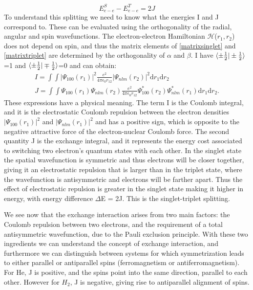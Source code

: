 \begin{equation}
E_{e-e}^S-E_{e-e}^T=2J
\end{equation}
To understand this splitting we need to know what the energies I and J correspond to. These can be evaluated using the orthogonality of the radial, angular and spin wavefunctions. The electron-electron Hamiltonian $\mathscr{H}$($r_1,r_2$) does not depend on spin, and thus the matrix elements of \ref{matrixsinglet} and \ref{matrixtriplet} are determined by the orthogonality of $\alpha$ and $\beta$. 
I have $\braket{\pm\frac{1}{2}|\pm\frac{1}{2}}$=1 and $\braket{\pm\frac{1}{2}|\mp\frac{1}{2}}$=0 and can obtain:
\begin{eqnarray}
I = \int\int |\Psi_{100}(r_1)|^2\frac{e^2}{4\pi\epsilon_0 r_{12}}|\Psi_{nlm}(r_2)|^2\text{d}r_1\text{d}r_2 \\
J=\int\int\Psi_{100}(r_1)\Psi_{nlm}(r_2)\frac{e^2}{4\pi\epsilon_0r_{12}}\Psi_{100}^*(r_2)\Psi_{nlm}^*(r_1)\text{d}r_1\text{d}r_2.
\end{eqnarray}
These expressions have a physical meaning. The term I is the Coulomb integral, and it is the electrostatic Coulomb repulsion between the electron densities $|\Psi_{100}(r_1)|^2$ and $|\Psi_{nlm}(r_1)|^2$ and has a positive sign, which is opposite to the negative attractive force of the electron-nuclear Coulomb force. The second quantity J is the exchange integral, and it represents the energy cost associated to switching two electron's quantum states with each other. In the singlet state the spatial wavefunction is symmetric and thus electrons will be closer together, giving it an electrostatic repulsion that is larger than in the triplet state, where the wavefunction is antisymmetric and electrons will be farther apart. Thus the effect of electrostatic repulsion is greater in the singlet state making it higher in energy, with energy difference $\Delta$E = 2J. This is the singlet-triplet splitting.

We see now that the exchange interaction arises from two main factors: the Coulomb repulsion between two electrons, and the requirement of a total antisymmetric wavefunction, due to the Pauli exclusion principle. With these two ingredients we can understand the concept of exchange interaction, and furthermore we can distinguish between systems for which symmetrization leads to either parallel or antiparallel spins (ferromagnetism or antiferromagnetism). For He, J is positive, and the spins point into the same direction, parallel to each other. However for $H_2$, J is negative, giving rise to antiparallel alignment of spins.

